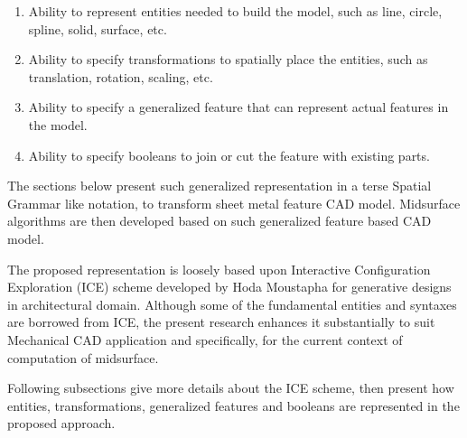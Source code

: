  
\begin{enumerate}%
[noitemsep,topsep=2pt,parsep=2pt,partopsep=2pt]

\item Ability to represent entities needed to build the model, such as line, circle, spline, solid, surface, etc.
\item Ability to specify transformations to spatially place the entities, such as translation, rotation, scaling, etc.
\item Ability to specify a generalized feature that can represent actual features in the model.
\item Ability to specify booleans to join or cut the feature with existing parts.  
\end{enumerate}


 
The sections below present such generalized representation in a terse Spatial Grammar like notation, to transform sheet metal feature CAD model. Midsurface algorithms are then developed based on such generalized feature based CAD model.

The proposed representation is loosely based upon Interactive Configuration Exploration  (ICE) scheme developed by Hoda Moustapha \cite{Hoda2005} for generative designs in architectural domain. Although some of the fundamental entities and syntaxes are borrowed from ICE, the present research enhances it substantially to suit Mechanical CAD application and specifically, for the current context of computation of midsurface.
 
 Following subsections give more details about the ICE scheme, then present how entities, transformations, generalized features and booleans are represented in the proposed approach.
 

 
